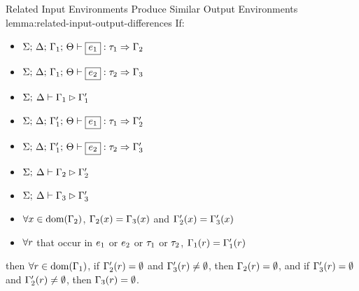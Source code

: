 \begin{oxlemma}{Related Input Environments Produce Similar Output Environments}
  {lemma:related-input-output-differences} If:
  \begin{itemize}
  \item
    $\oxtypjudge{\oxglobalctx}{\oxtvarctx}{\oxkontctx}{\oxvarctx_1}{\oxexpr_1}{\oxtype_1}{\oxvarctx_2}$
  \item
    $\oxtypjudge{\oxglobalctx}{\oxtvarctx}{\oxkontctx}{\oxvarctx_1}{\oxexpr_2}{\oxtype_2}{\oxvarctx_3}$
  \item
    $\Sigma; \: \Delta \vdash \Gamma_1 \rhd \Gamma_1^\prime$
  \item
    $\oxtypjudge{\oxglobalctx}{\oxtvarctx}{\oxkontctx}{\oxvarctx_1^\prime}{\oxexpr_1}{\oxtype_1}{\oxvarctx_2^\prime}$
  \item
    $\oxtypjudge{\oxglobalctx}{\oxtvarctx}{\oxkontctx}{\oxvarctx_1^\prime}{\oxexpr_2}{\oxtype_2}{\oxvarctx_3^\prime}$
  \item
    $\Sigma; \: \Delta \vdash \Gamma_2 \rhd \Gamma_2^\prime$
  \item
    $\Sigma; \: \Delta \vdash \Gamma_3 \rhd \Gamma_3^\prime$
  \item $\forall x \in \textrm{dom}(\Gamma_2)$, $\Gamma_2(x) =
    \Gamma_3(x)$ and $\Gamma_2^\prime(x) =
    \Gamma_3^\prime(x)$
  \item $\forall r$ that occur in $e_1$ or $e_2$ or
    $\tau_1$ or $\tau_2$, $\Gamma_1(r) =
    \Gamma_1^\prime(r)$
  \end{itemize}

  then $\forall r \in \textrm{dom}(\Gamma_1)$, if
  $\Gamma_2^\prime(r) = \emptyset$ and $\Gamma_3^\prime(r)
  \neq \emptyset$, then $\Gamma_2(r) = \emptyset$, and if
  $\Gamma_3^\prime(r) = \emptyset$ and $\Gamma_2^\prime(r)
  \neq \emptyset$, then $\Gamma_3(r) = \emptyset$.
\end{oxlemma}
